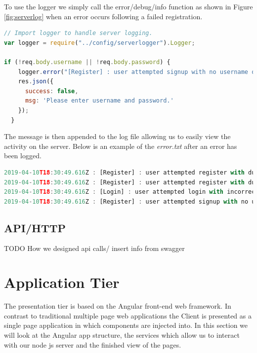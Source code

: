 To use the logger we simply call the error/debug/info function as shown in Figure \ref{fig:serverlog} when an error occurs following a failed registration.

\begin{lstlisting}[language=JAVASCRIPT,caption={Server Log call from API},captionpos=b,label={fig:serverlog}]
// Import logger to handle server logging. 
var logger = require("../config/serverlogger").Logger;

if (!req.body.username || !req.body.password) {
    logger.error("[Register] : user attempted signup with no username or password");
    res.json({
      success: false,
      msg: 'Please enter username and password.'
    });
  }
\end{lstlisting}

The message is then appended to the log file allowing us to easily view the activity on the server. Below is an example of the \textit{error.txt} after an error has been logged.

\begin{lstlisting}[language=JAVASCRIPT,caption={error.txt log file},captionpos=b,label={fig:errorlog}]
2019-04-10T18:30:49.616Z : [Register] : user attempted register with duplicate username
2019-04-10T18:30:49.616Z : [Register] : user attempted register with duplicate email
2019-04-10T18:30:49.616Z : [Login] : user attempted login with incorrect password
2019-04-10T18:30:49.616Z : [Register] : user attempted signup with no username or password
\end{lstlisting}

\subsection{API/HTTP}
TODO
How we designed api calls/
insert info from swagger

\section{Application Tier}
The presentation tier is based on the Angular front-end web framework. In contrast to traditional multiple page web applications the Client is presented as a single page application in which components are injected into. In this section we will look at the Angular app structure, the services which allow us to interact with our node js server and the finished view of the pages.

